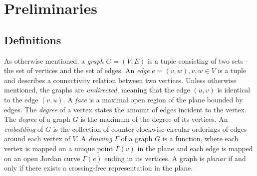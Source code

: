 \section{Preliminaries}
\subsection{Definitions}
As otherwise mentioned, a \emph{graph} $G=(V,E)$ is a tuple consisting of two sets - the set of vertices and the set of edges. An \emph{edge} $e = (v,w), v,w \in V$ is a tuple and describes a connectivity relation between two vertices. Unless otherwise mentioned, the graphs are \emph{undirected}, meaning that the edge $(u,v)$ is identical to the edge $(v,u)$. 
A \emph{face} is a maximal open region of the plane bounded by edges. 
The \emph{degree} of a vertex states the amount of edges incident to the vertex. The \emph{degree} of a graph $G$ is the maximum of the degree of its vertices. 
An \emph{embedding} of $G$ is the collection of counter-clockwise circular orderings of edges around each vertex of $V$.
A \emph{drawing} $\Gamma$ of a graph $G$ is a function, where each vertex is mapped on a unique point $\Gamma(v)$ in the plane and each edge is mapped on an open Jordan curve $\Gamma(e)$ ending in its vertices. 
A graph is \emph{planar} if and only if there exists a crossing-free representation in the plane. 
\cite[Page 100]{DBLP:books/daglib/0023376}